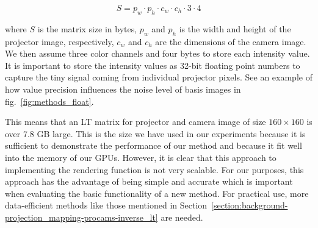 \begin{equation}
    \label{eq:lt_matrix_size}
    S = p_w \cdot p_h \cdot c_w \cdot c_h \cdot 3 \cdot 4
\end{equation}

where \(S\) is the matrix size in bytes, \(p_w\) and \(p_h\) is the width and height of the projector image, respectively, \(c_w\) and \(c_h\) are the dimensions of the camera image. We then assume three color channels and four bytes to store each intensity value. It is important to store the intensity values as 32-bit floating point numbers to capture the tiny signal coming from individual projector pixels. See an example of how value precision influences the noise level of basis images in fig.~\ref{fig:methods_float}.

This means that an LT matrix for projector and camera image of size \(160 \times 160\) is over 7.8 GB large. This is the size we have used in our experiments because it is sufficient to demonstrate the performance of our method and because it fit well into the memory of our GPUs. However, it is clear that this approach to implementing the rendering function is not very scalable. For our purposes, this approach has the advantage of being simple and accurate which is important when evaluating the basic functionality of a new method. For practical use, more data-efficient methods like those mentioned in Section~\ref{section:background-projection_mapping-procams-inverse_lt} are needed.

